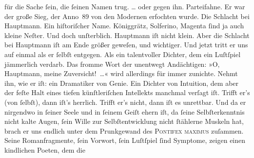 \begin{ledgroupsized}[t]{13cm}
{{                  für die Sache ſein, die ſeinen Namen trug. \textsc{\label{K_L03438-4v}\label{K_L03438-4h}}{\dots} oder gegen ihn. Parteifahne. Er war der große Sieg,
                  der Anno 89 von den Modernen erfochten wurde. Die Schlacht bei Hauptmann. Ein hiſtoriſcher Name. Königgrätz, Solferino,
                     Magenta ſind ja auch kleine Neſter. Und
                  doch unſterblich. Hauptmann iſt nicht
                  klein. Aber die Schlacht bei Hauptmann iſt
                  am Ende größer geweſen, und wichtiger. Und jetzt tritt er uns auf einmal als er
                  ſelbſt entgegen. Als ein talentvoller Dichter, dem ein Luſtſpiel jämmerlich
                  verdarb. Das fromme Wort der unentwegt Andächtigen: »O, Hauptmann, meine Zuversicht! {\dots}«
                  wird allerdings für immer zunichte. Nehmt ihn, wie er iſt: ein Dramatiker von
                  Genie. Ein Dichter von Intuition, dem aber der feſte Halt eines tiefen
                  künſtleriſchen Intellekts manchmal verſagt iſt. Trifft er’s (von ſelbſt), dann
                  iſt’s herrlich. Trifft er’s nicht, dann iſt es unrettbar. Und da er nirgendwo in
                  ſeiner Seele und in ſeinem Geiſt ehern iſt, da ſeine Selbſterkenntnis nicht kalte
                  Augen, ſein Wille zur Selbſtentwicklung nicht ſtählerne Muskeln hat, brach er uns
                  endlich unter dem Prunkgewand des \textsc{Pontifex maximus}
                  zuſammen. Seine Romanfragmente, ſein Vorwort, ſein Luſtſpiel ſind Symptome, zeigen einen kindlichen Poeten, dem die
}}
\end{ledgroupsized}
